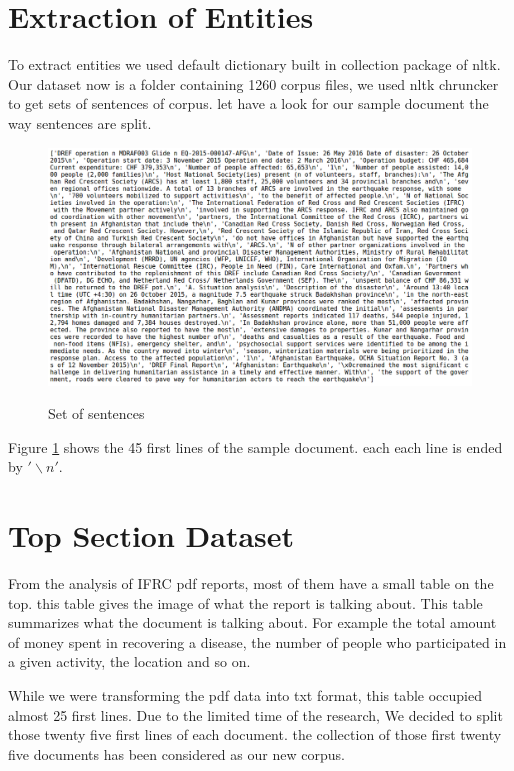 \section{Extraction of Entities }

To extract entities we used default dictionary built in collection package of nltk. Our dataset now is a folder containing 1260 corpus files, we  used nltk chruncker to get sets of sentences of corpus. let have a look for our sample document the way sentences are split.
\begin{figure}[hbtp]
\caption{Set of sentences}
\centering
\includegraphics[scale=0.4]{images/corpus.png}\label{Set of sentences}
\end{figure}


Figure \ref{Set of sentences} shows the 45 first lines of the sample document. each each line is ended by  $'\backslash n'$.

\section{Top Section Dataset \label{top}}

From the analysis of IFRC pdf reports, most of them have a small table on the top. this table gives the image of what the report is talking about. This table summarizes what the document is talking about. For example the total amount of money spent in recovering a disease, the number of people who participated in a given activity, the location and so on.

While we were transforming the pdf data into txt format, this table occupied almost 25 first lines. Due to the limited time of the research, We decided to split those twenty five first lines of each document. the collection of those first twenty five documents has been considered as our new corpus.

